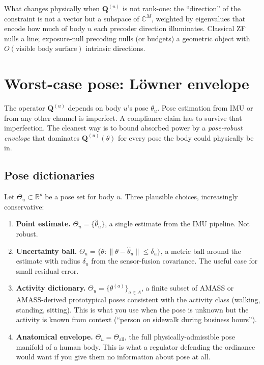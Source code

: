\documentclass[11pt,a4paper]{article}
\theoremstyle{definition}
\newcommand{\Q}{\mathbf{Q}}
\newcommand{\Reals}{\mathbb{R}}
\newcommand{\Complex}{\mathbb{C}}
\newcommand{\Poses}{\Theta}
\begin{document}
What changes physically when $\Q^{(u)}$ is not rank-one: the
``direction'' of the constraint is not a vector but a subspace of
$\Complex^M$, weighted by eigenvalues that encode how much of body
$u$ each precoder direction illuminates. Classical ZF nulls a line;
exposure-null precoding nulls (or budgets) a geometric object with
$O(\text{visible body surface})$ intrinsic directions.

\section{Worst-case pose: Löwner envelope}\label{sec:worstcase}

The operator $\Q^{(u)}$ depends on body $u$'s pose $\theta_u$.
Pose estimation from IMU or from any other channel is imperfect. A
compliance claim has to survive that imperfection. The cleanest way
is to bound absorbed power by a \emph{pose-robust envelope} that
dominates $\Q^{(u)}(\theta)$ for every pose the body could physically
be in.

\subsection{Pose dictionaries}

Let $\Poses_u\subset\Reals^{p}$ be a pose set for body $u$. Three
plausible choices, increasingly conservative:

\begin{enumerate}[leftmargin=1.6em,itemsep=2pt]
\item \textbf{Point estimate.} $\Poses_u=\{\hat\theta_u\}$, a single
estimate from the IMU pipeline. Not robust.
\item \textbf{Uncertainty ball.}
$\Poses_u=\{\theta:\|\theta-\hat\theta_u\|\le\delta_u\}$, a metric
ball around the estimate with radius $\delta_u$ from the sensor-fusion
covariance. The useful case for small residual error.
\item \textbf{Activity dictionary.}
$\Poses_u=\{\theta^{(a)}\}_{a\in A}$, a finite subset of AMASS or
AMASS-derived prototypical poses consistent with the activity class
(walking, standing, sitting). This is what you use when the pose is
unknown but the activity is known from context (``person on sidewalk
during business hours'').
\item \textbf{Anatomical envelope.} $\Poses_u=\Poses_{\mathrm{all}}$,
the full physically-admissible pose manifold of a human body. This is
what a regulator defending the ordinance would want if you give them
no information about pose at all.
\end{enumerate}
\end{document}
